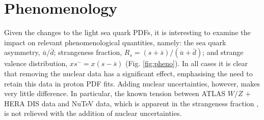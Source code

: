 \section{Phenomenology} \label{sec:pheno}
%
Given the changes to the light sea quark PDFs, it is interesting to examine the impact on relevant phenomenological quantities, namely: the sea quark asymmetry, $\bar{u}/\bar{d}$; strangeness fraction, $R_s = (s+ \bar{s})/(\bar{u} + \bar{d})$; and strange valence distribution, $xs^- = x(s - \bar{s})$ (Fig. \ref{fig:pheno}). In all cases it is clear that removing the nuclear data has a significant effect, emphasising the need to retain this data in proton PDF fits. Adding nuclear uncertainties, however, makes very little difference. In particular, the known tension between ATLAS $W/Z$ + HERA DIS data and NuTeV data, which is apparent in the strangeness fraction \cite{Aad:2012sb}, is not relieved with the addition of nuclear uncertainties. 


